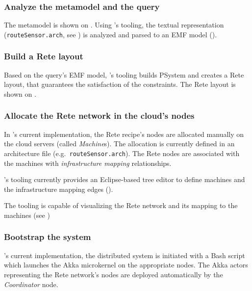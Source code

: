 \subsubsection{Analyze the metamodel and the query}

The metamodel is shown on . Using \eiq{}'s tooling, the textual representation (\texttt{routeSensor.arch}, see ) is analyzed and parsed to an EMF model ().


\subsubsection{Build a Rete layout}

Based on the query's EMF model, \eiq{}'s tooling builds PSystem and creates a Rete layout, that guarantees the satisfaction of the constraints. The Rete layout is shown on . 

\subsubsection{Allocate the Rete network in the cloud's nodes} 

In \iqd{}'s current implementation, the Rete recipe's nodes are allocated manually on the cloud servers (called \textit{Machine}s). The allocation is currently defined in an architecture file (e.g.\ \texttt{routeSensor.arch}). The Rete nodes are associated with the machines with \textit{infrastructure mapping} relationships.

\iqd{}'s tooling currently provides an Eclipse-based tree editor to define machines and the infrastructure mapping edges ().


The tooling is capable of visualizing the Rete network and its mapping to the machines (see )


\subsubsection{Bootstrap the system}

\iqd{}'s current implementation, the distributed system is initiated with a Bash script which launches the Akka microkernel on the appropriate nodes. The Akka actors representing the Rete network's nodes are deployed automatically by the \iqd{} \textit{Coordinator} node.
